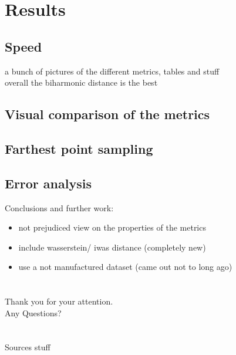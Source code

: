 \documentclass[]{beamer}
\begin{document}
\section{Results}
\subsection{Speed}
	\begin{frame}
		a bunch of pictures of the different metrics, tables and stuff\\
		overall the biharmonic distance is the best
	\end{frame}

\subsection{Visual comparison of the metrics}
	\begin{frame}
	\end{frame}

\subsection{Farthest point sampling}
	\begin{frame}
	\end{frame}

\subsection{Error analysis}
	\begin{frame}
	\end{frame}

	\begin{frame}
		Conclusions and further work:
		\begin{itemize}
			\item not prejudiced view on the properties of the metrics
			\item include wasserstein/ iwas distance (completely new)
			\item use a not manufactured dataset (came out not to long ago)
		\end{itemize}
	\end{frame}

\section*{}
	\begin{frame}
		\centering \large
		Thank you for your attention.\\
		Any Questions?
	\end{frame}

\section*{} %
\appendix
	\begin{frame}{Sources}
		stuff
	\end{frame}
\end{document}
